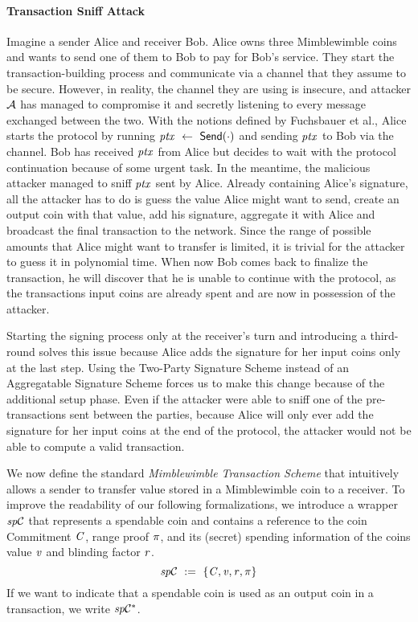 \paragraph{Transaction Sniff Attack}
Imagine a sender Alice and receiver Bob.
Alice owns three Mimblewimble coins and wants to send one of them to Bob to pay for Bob's service.
They start the transaction-building process and communicate via a channel that they assume to be secure.
However, in reality, the channel they are using is insecure, and attacker $\mathcal{A}$ has managed to compromise it and secretly listening to every message exchanged between the two.
With the notions defined by Fuchsbauer et al., Alice starts the protocol by running $\mathit{ptx} ~\leftarrow~ \mathsf{Send}(\cdot)$ and sending $\mathit{ptx}$ to Bob via the channel.
Bob has received $\mathit{ptx}$ from Alice but decides to wait with the protocol continuation because of some urgent task.
In the meantime, the malicious attacker managed to sniff $\mathit{ptx}$ sent by Alice.
Already containing Alice's signature, all the attacker has to do is guess the value Alice might want to send, create an output coin with that value, add his signature, aggregate it with Alice and broadcast the final transaction to the network.
Since the range of possible amounts that Alice might want to transfer is limited, it is trivial for the attacker to guess it in polynomial time.
When now Bob comes back to finalize the transaction, he will discover that he is unable to continue with the protocol, as the transactions input coins are already spent and are now in possession of the attacker.

Starting the signing process only at the receiver's turn and introducing a third-round solves this issue because Alice adds the signature for her input coins only at the last step.
Using the Two-Party Signature Scheme instead of an Aggregatable Signature Scheme forces us to make this change because of the additional setup phase.
Even if the attacker were able to sniff one of the pre-transactions sent between the parties, because Alice will only ever add the signature for her input coins at the end of the protocol, the attacker would not be able to compute a valid transaction.

We now define the standard \emph{Mimblewimble Transaction Scheme} that intuitively allows a sender to transfer value stored in a Mimblewimble coin to a receiver.
To improve the readability of our following formalizations, we introduce a wrapper $\mathit{sp}\mathcal{C}$ that represents a spendable coin and contains a reference to the coin Commitment $\mathit{C}$, range proof $\pi$, and its (secret) spending information of the coins value $\mathit{v}$ and blinding factor $\mathit{r}$.
\[ \mathit{sp}\mathcal{C} ~:=~ \{ \mathit{C}, \mathit{v}, \mathit{r}, \pi \} \]
If we want to indicate that a spendable coin is used as an output coin in a transaction, we write $\mathit{sp}\mathcal{C}^*$.

